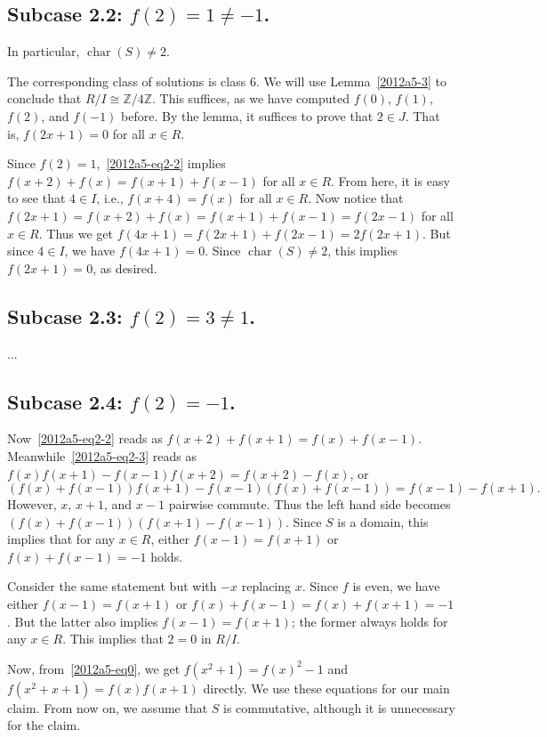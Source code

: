 \documentclass{article}
\newcommand{\Z}{\mathbb{Z}}
\DeclareMathOperator{\rchar}{char}
\begin{document}
\subsection*{Subcase 2.2: $f(2) = 1 \neq -1$.}

In particular, $\rchar(S) \neq 2$.

The corresponding class of solutions is class 6.
We will use Lemma~\ref{2012a5-3} to conclude that $R/I \cong \Z/4\Z$.
This suffices, as we have computed $f(0)$, $f(1)$, $f(2)$, and $f(-1)$ before.
By the lemma, it suffices to prove that $2 \in J$.
That is, $f(2x + 1) = 0$ for all $x \in R$.

Since $f(2) = 1$,~\eqref{2012a5-eq2-2} implies $f(x + 2) + f(x) = f(x + 1) + f(x - 1)$ for all $x \in R$.
From here, it is easy to see that $4 \in I$, i.e., $f(x + 4) = f(x)$ for all $x \in R$.
Now notice that $f(2x + 1) = f(x + 2) + f(x) = f(x + 1) + f(x - 1) = f(2x - 1)$ for all $x \in R$.
Thus we get $f(4x + 1) = f(2x + 1) + f(2x - 1) = 2 f(2x + 1)$.
But since $4 \in I$, we have $f(4x + 1) = 0$.
Since $\rchar(S) \neq 2$, this implies $f(2x + 1) = 0$, as desired.


\subsection*{Subcase 2.3: $f(2) = 3 \neq 1$.}

...


\subsection*{Subcase 2.4: $f(2) = -1$.}

Now~\eqref{2012a5-eq2-2} reads as $f(x + 2) + f(x + 1) = f(x) + f(x - 1)$.
Meanwhile~\eqref{2012a5-eq2-3} reads as $f(x) f(x + 1) - f(x - 1) f(x + 2) = f(x + 2) - f(x)$, or
\[ (f(x) + f(x - 1)) f(x + 1) - f(x - 1) (f(x) + f(x - 1)) = f(x - 1) - f(x + 1). \]
However, $x$, $x + 1$, and $x - 1$ pairwise commute.
Thus the left hand side becomes $(f(x) + f(x - 1)) (f(x + 1) - f(x - 1))$.
Since $S$ is a domain, this implies that for any $x \in R$, either $f(x - 1) = f(x + 1)$ or $f(x) + f(x - 1) = -1$ holds.

Consider the same statement but with $-x$ replacing $x$.
Since $f$ is even, we have either $f(x - 1) = f(x + 1)$ or $f(x) + f(x - 1) = f(x) + f(x + 1) = -1$.
But the latter also implies $f(x - 1) = f(x + 1)$; the former always holds for any $x \in R$.
This implies that $2 = 0$ in $R/I$.

Now, from~\eqref{2012a5-eq0}, we get $f(x^2 + 1) = f(x)^2 - 1$ and $f(x^2 + x + 1) = f(x) f(x + 1)$ directly.
We use these equations for our main claim.
From now on, we assume that $S$ is commutative, although it is unnecessary for the claim.
\end{document}
